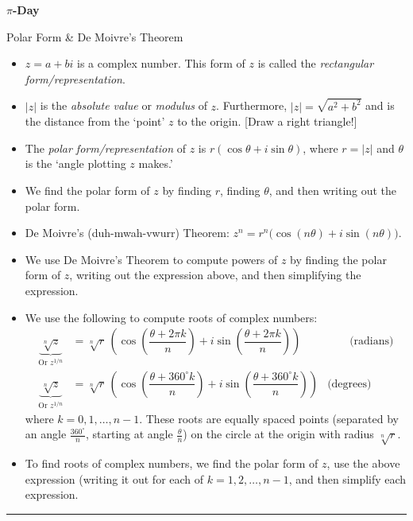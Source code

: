 \documentclass[11pt,letterpaper]{article}
\begin{document}

\begin{center} {\bfseries \LARGE $\pi$-Day \par Polar Form \& De Moivre's Theorem} \end{center} \par\vspace{0.2\baselineskip}

{\scriptsize {}
	\begin{itemize}
	\item $z= a + bi$ is a complex number. This form of $z$ is called the \textit{rectangular form/representation}.
	\item $|z|$ is the \textit{absolute value} or \textit{modulus} of $z$. Furthermore, $|z|= \sqrt{a^2 + b^2}$ and is the distance from the `point' $z$ to the origin. [Draw a right triangle!]
	\item The \textit{polar form/representation} of $z$ is $r (\cos \theta + i \sin \theta)$, where $r= |z|$ and $\theta$ is the `angle plotting $z$ makes.'
	\item We find the polar form of $z$ by finding $r$, finding $\theta$, and then writing out the polar form.
	\item De Moivre's (duh-mwah-vwurr) Theorem: $z^n= r^n \big(\cos(n\theta) + i \sin(n\theta) \big)$.
	\item We use De Moivre's Theorem to compute powers of $z$ by finding the polar form of $z$, writing out the expression above, and then simplifying the expression.
	\item We use the following to compute roots of complex numbers: 
		\[
		\begin{aligned}
		\underbrace{\sqrt[n]{z}}_{\text{Or } z^{1/n}}&= \sqrt[n]{r} \, \left( \cos \left( \dfrac{\theta + 2\pi k}{n} \right) + i \sin \left( \dfrac{\theta + 2\pi k}{n} \right) \right) & \qquad \text{(radians)} \\
		\underbrace{\sqrt[n]{z}}_{\text{Or } z^{1/n}}&= \sqrt[n]{r} \, \left( \cos \left( \dfrac{\theta + 360^\circ k}{n} \right) + i \sin \left( \dfrac{\theta + 360^\circ k}{n} \right) \right) & \text{(degrees)}
		\end{aligned}
		\]
	where $k= 0, 1, \ldots, n-1$. These roots are equally spaced points (separated by an angle $\frac{360^\circ}{n}$, starting at angle $\frac{\theta}{n}$) on the circle at the origin with radius $\sqrt[n]{r}$.
	\item To find roots of complex numbers, we find the polar form of $z$, use the above expression (writing it out for each of $k= 1, 2, \ldots, n - 1$, and then simplify each expression.
	\end{itemize}
}

\noindent\rule{\textwidth}{0.4pt}
\end{document}
